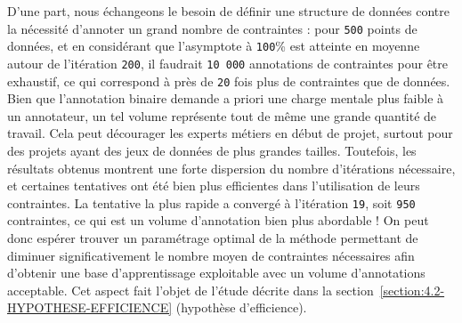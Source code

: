 			D'une part, nous échangeons le besoin de définir une structure de données contre la nécessité d'annoter un grand nombre de contraintes : pour \texttt{500} points de données, et en considérant que l'asymptote à \texttt{100}\% est atteinte en moyenne autour de l'itération \texttt{200}, il faudrait \texttt{10 000} annotations de contraintes pour être exhaustif, ce qui correspond à près de \texttt{20} fois plus de contraintes que de données.
			Bien que l'annotation binaire demande a priori une charge mentale plus faible à un annotateur, un tel volume représente tout de même une grande quantité de travail.
			Cela peut décourager les experts métiers en début de projet, surtout pour des projets ayant des jeux de données de plus grandes tailles.
			Toutefois, les résultats obtenus montrent une forte dispersion du nombre d'itérations nécessaire, et certaines tentatives ont été bien plus efficientes dans l'utilisation de leurs contraintes. La tentative la plus rapide a convergé à l'itération \texttt{19}, soit \texttt{950} contraintes, ce qui est un volume d'annotation bien plus abordable !
			On peut donc espérer trouver un paramétrage optimal de la méthode permettant de diminuer significativement le nombre moyen de contraintes nécessaires afin d'obtenir une base d'apprentissage exploitable avec un volume d'annotations acceptable.
			Cet aspect fait l'objet de l'étude décrite dans la section~\ref{section:4.2-HYPOTHESE-EFFICIENCE} (hypothèse d'efficience).
			
